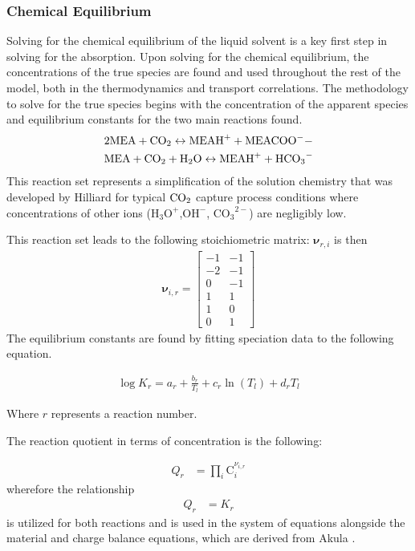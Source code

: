 \documentclass[a4paper,fleqn]{cas-sc}
\newcommand{\COtwo}{{\ce{CO2}}}
\newcommand{\HtwoO}{{\ce{H2O}}}
\newcommand{\MEA}{{\ce{MEA}}}
\newcommand{\MEAH}{\ce{MEAH+}}
\newcommand{\MEACOO}{{\ce{MEACOO-}}}
\newcommand{\HCOthree}{{\ce{HCO3-}}}
\begin{document}
    \subsubsection{Chemical Equilibrium}
    Solving for the chemical equilibrium of the liquid solvent is a key first step in solving for the absorption. Upon solving for the chemical equilibrium, the concentrations of the true species are found and used throughout the rest of the model, both in the thermodynamics and transport correlations. The methodology to solve for the true species begins with the concentration of the apparent species and equilibrium constants for the two main reactions found.
    \begin{align}
        & 2 \MEA+\COtwo \leftrightarrow \MEAH +\MEACOO- \\
        & \MEA+\COtwo+\HtwoO \leftrightarrow \MEAH +\HCOthree
    \end{align}
    This reaction set represents a simplification of the solution chemistry that was developed by Hilliard \cite{Hillard2008} for typical $\COtwo$ capture process conditions where concentrations of other ions (${\text{H}_3 \text{O}}^+$,${\text{OH}}^-$, ${\text{CO}_3}^{2-}$) are negligibly low.

    This reaction set leads to the following stoichiometric matrix: $\mathbf{\nu}_{r,i}$ is then
    \begin{align}
        \mathbf{\nu}_{i, r} =
        \begin{bmatrix}
            -1 & -1 \\
            -2 & -1 \\
            0 & -1 \\
            1 &  1 \\
            1 &  0 \\
            0 &  1
        \end{bmatrix}
    \end{align}
    The equilibrium constants are found by fitting speciation data to the following equation.

    \begin{align}
        \log K_r = a_r + \frac{b_r}{T_l} + c_r \ln(T_l) + d_r T_l
    \end{align}

    Where $r$ represents a reaction number.

    The reaction quotient in terms of concentration is the following:

    \begin{align}
        Q_r &= \prod_i \text{C}_i^{\nu_{i,r}}
    \end{align}
    wherefore the relationship
    \begin{align}
        Q_r &= K_r
    \end{align}
    is utilized for both reactions and is used in the system of equations alongside the material and charge balance equations, which are derived from Akula \cite{Akula2023AppendixAkula}.
\end{document}
